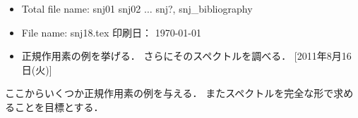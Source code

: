 %
\hide
\vspace{-4mm}
\begin{itemize} \itemsep=-2mm \parsep=0mm
\item Total file name: snj01 snj02 $\dots $ snj?, snj\_bibliography
\item File name: snj18.tex \hfill 印刷日： \today \ \now
\item 正規作用素の例を挙げる．
さらにそのスペクトルを調べる．
[2011年8月16日(火)]
\end{itemize}
\endhide
{} %
ここからいくつか正規作用素の例を与える．
またスペクトルを完全な形で求めることを目標とする．

